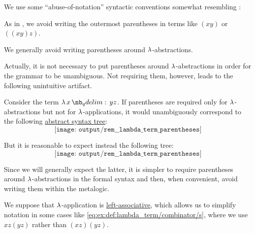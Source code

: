 \begin{remark}\label{rem:lambda_term_parentheses}
  We use some \enquote{abuse-of-notation} syntactic conventions somewhat resembling :
  \begin{thmenum}
     As in , we avoid writing the outermost parentheses in terms like \( (xy) \) or \( ((xy)z) \).

     We generally avoid writing parentheses around \( \mathrm{\lambda} \)-abstractions.

    Actually, it is not necessary to put parentheses around \( \mathrm{\lambda} \)-abstractions in order for the grammar to be unambiguous. Not requiring them, however, leads to the following unintuitive artifact.

    Consider the term \( \qabs x y z \). If parentheses are required only for \( \mathrm{\lambda} \)-abstractions but not for \( \mathrm{\lambda} \)-applications, it would unambiguously correspond to the following \hyperref[rem:lambda_term_ast]{abstract syntax tree}:
    \begin{equation*}
      \texttt{[image: output/rem\_\_lambda\_term\_parentheses]}
    \end{equation*}

    But it is reasonable to expect instead the following tree:
    \begin{equation*}
      \texttt{[image: output/rem\_\_lambda\_term\_parentheses]}
    \end{equation*}

    Since we will generally expect the latter, it is simpler to require parentheses around \( \mathrm{\lambda} \)-abstractions in the formal syntax and then, when convenient, avoid writing them within the metalogic.

     We suppose that \( \mathrm{\lambda} \)-application is \hyperref[rem:binary_operation_syntax_trees/associativity]{left-associative}, which allows us to simplify notation in some cases like \eqref{eq:ex:def:lambda_term/combinator/s}, where we use \( xz(yz) \) rather than \( (xz)(yz) \).
  \end{thmenum}
\end{remark}

